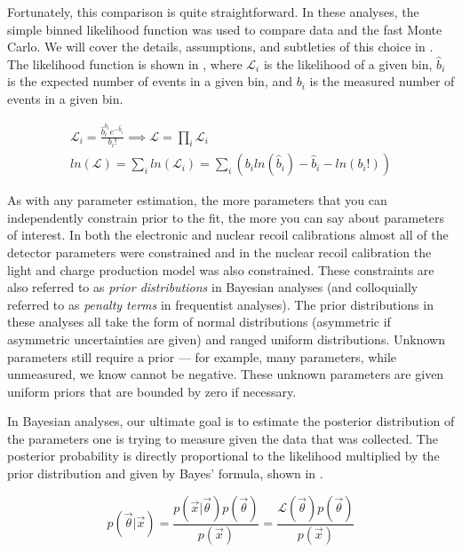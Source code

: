 Fortunately, this comparison is quite straightforward.  In these analyses, the simple binned likelihood function was used to compare data and the fast Monte Carlo.  We will cover the details, assumptions, and subtleties of this choice in .  The likelihood function is shown in , where $\mathcal{L}_i$ is the likelihood of a given bin, $\hat{b}_i$ is the expected number of events in a given bin, and $b_i$ is the measured number of events in a given bin.

\begin{equation}
        \label{eqn:xe1t_binned_likelihood}
        \begin{gathered}
                \mathcal{L}_i = \frac{\hat{b}_i^{b_i} e^{-\hat{b}_i}}{b_i!} \implies \mathcal{L} = \prod_i \mathcal{L}_i \\ 
                ln(\mathcal{L}) = \sum_i ln(\mathcal{L}_i) = \sum_i ( b_i ln(\hat{b}_i) - \hat{b}_i - ln(b_i!) )
        \end{gathered}
\end{equation}


As with any parameter estimation, the more parameters that you can independently constrain prior to the fit, the more you can say about parameters of interest.  In both the electronic and nuclear recoil calibrations almost all of the detector parameters were constrained and in the nuclear recoil calibration the light and charge production model was also constrained.  These constraints are also referred to as \textit{prior distributions} in Bayesian analyses (and colloquially referred to as \textit{penalty terms} in frequentist analyses).  The prior distributions in these analyses all take the form of normal distributions (asymmetric if asymmetric uncertainties are given) and ranged uniform distributions.  Unknown parameters still require a prior --- for example, many parameters, while unmeasured, we know cannot be negative.  These unknown parameters are given uniform priors that are bounded by zero if necessary.


In Bayesian analyses, our ultimate goal is to estimate the posterior distribution of the parameters one is trying to measure given the data that was collected.  The posterior probability is directly proportional to the likelihood multiplied by the prior distribution and given by Bayes' formula, shown in  \cite{bayes1763essay}.

\begin{equation}
        \label{eqn:xe1t_bayes_formula}
        p(\vec{\theta}|\vec{x}) = \frac{p(\vec{x}|\vec{\theta}) p(\vec{\theta})}{p(\vec{x})} = \frac{\mathcal{L}(\vec{\theta}) p(\vec{\theta})}{p(\vec{x})}
\end{equation}


